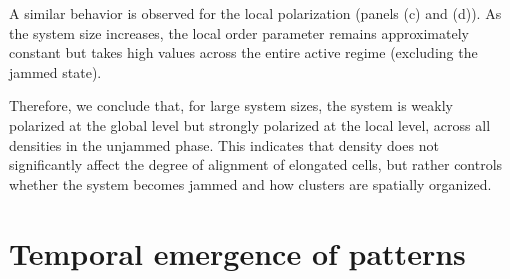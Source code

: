 \documentclass[%
reprint,
amsmath,amssymb,
aps,
]{revtex4-2}
\begin{document}
	A similar behavior is observed for the local polarization (panels (c) and (d)). As the system size increases, the local order parameter remains approximately constant but takes high values across the entire active regime (excluding the jammed state).
	
	Therefore, we conclude that, for large system sizes, the system is weakly polarized at the global level but strongly polarized at the local level, across all densities in the unjammed phase. This indicates that density does not significantly affect the degree of alignment of elongated cells, but rather controls whether the system becomes jammed and how clusters are spatially organized.


	\section{\label{sec:level6} Temporal emergence of patterns}
	
\end{document}
